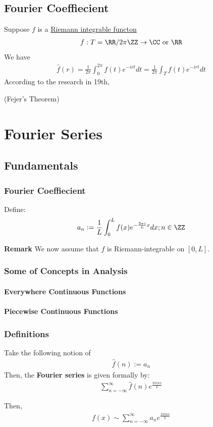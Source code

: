 \documentclass[Total.tex]{subfiles}
\begin{document}
	\section{Fourier Coeffiecient}
	Suppose $f$ is a \underline{Riemann integrable functon}
	\begin{gather*}
		f:T=\RR/2\pi \ZZ\rightarrow \CC\mbox{ or }\RR
	\end{gather*}
	We have
	\begin{gather*}
		\hat{f}(r)=\frac{1}{2\pi}\int_0^{2\pi} f(t)e^{-irt}dt=\frac{1}{2\pi}\int_T f(t)e^{-irt}dt
	\end{gather*}
	According to the research in 19th,
	
	\begin{theorem}
		(Fejer's Theorem)
	\end{theorem}
	\chapter{Fourier Series}
	\section{Fundamentals}
	\subsection{Fourier Coeffiecient}
	\begin{Def}
		Define:
		\begin{gather*}
			a_n:=\frac{1}{L}\int_0^L f(x)e^{-\frac{2\pi i}{L}x}dx;n\in \ZZ
		\end{gather*}
	\end{Def}
	\textbf{Remark} We now assume that $f$ is Riemann-integrable on $[0,L]$. 
	\subsection{Some of Concepts in Analysis}
	\subsubsection{Everywhere Continuous Functions}
	\subsubsection{Piecewise Continuous Functions}
	\subsection{Definitions}
	\begin{Def}
		Take the following notion of
		\begin{gather*}
			\hat{f}(n):=a_n
		\end{gather*}
		Then, the \textbf{Fourier series} is given formally by:
		\begin{gather*}
			\sum_{n=-\infty}^\infty \hat{f}(n)e^{\frac{2\pi inx}{L}}
		\end{gather*}
	\end{Def}
	Then, 
	\begin{gather*}
		f(x)\sim \sum_{n=-\infty}^\infty a_n e^{\frac{2\pi inx}{L}}
	\end{gather*}
	
\end{document}
